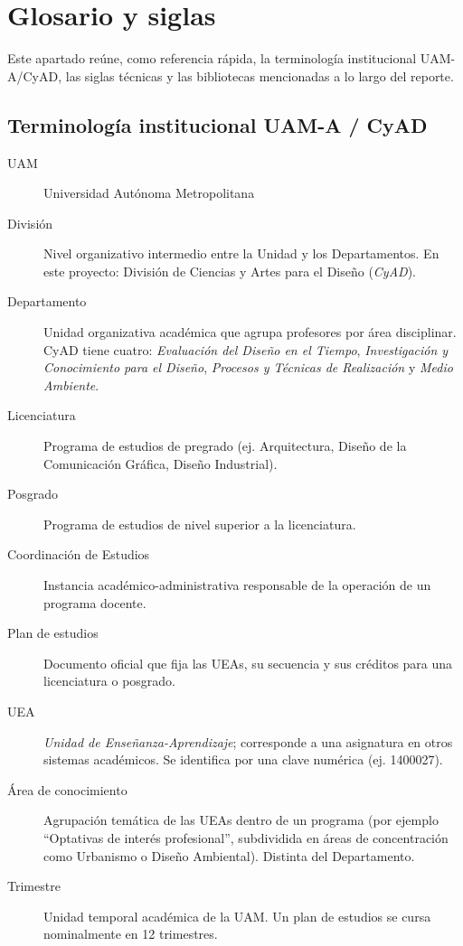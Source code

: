\section*{Glosario y siglas}\label{subsec:glosario}\justifying

Este apartado reúne, como referencia rápida, la terminología institucional UAM-A/CyAD, las siglas técnicas y las bibliotecas mencionadas a lo largo del reporte.

\subsection*{Terminología institucional UAM-A / CyAD}

\begin{description}
    \item[UAM] Universidad Autónoma Metropolitana
    \item[División] Nivel organizativo intermedio entre la Unidad y los Departamentos. En este proyecto: División de Ciencias y Artes para el Diseño (\emph{CyAD}).
    \item[Departamento] Unidad organizativa académica que agrupa profesores por área disciplinar. CyAD tiene cuatro: \emph{Evaluación del Diseño en el Tiempo}, \emph{Investigación y Conocimiento para el Diseño}, \emph{Procesos y Técnicas de Realización} y \emph{Medio Ambiente}.
    \item[Licenciatura] Programa de estudios de pregrado (ej. Arquitectura, Diseño de la Comunicación Gráfica, Diseño Industrial).
    \item[Posgrado] Programa de estudios de nivel superior a la licenciatura.
    \item[Coordinación de Estudios] Instancia académico-administrativa responsable de la operación de un programa docente.
    \item[Plan de estudios] Documento oficial que fija las UEAs, su secuencia y sus créditos para una licenciatura o posgrado.
    \item[UEA] \emph{Unidad de Enseñanza-Aprendizaje}; corresponde a una asignatura en otros sistemas académicos. Se identifica por una clave numérica (ej. 1400027).
    \item[Área de conocimiento] Agrupación temática de las UEAs dentro de un programa (por ejemplo ``Optativas de interés profesional'', subdividida en áreas de concentración como Urbanismo o Diseño Ambiental). Distinta del Departamento.
    \item[Trimestre] Unidad temporal académica de la UAM. Un plan de estudios se cursa nominalmente en 12 trimestres.

\end{description}
